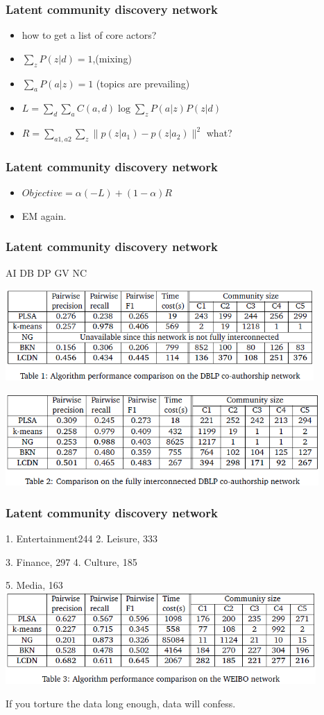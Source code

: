 \documentclass[professionalfonts]{beamer}
\begin{document}
\begin{frame}
\frametitle{Latent community discovery network}
\begin{itemize}
\item how to get a list of core actors?
\item $\sum_z P(z|d)=1$,(mixing) 
\item $\sum_a P(a|z)=1$ (topics are prevailing)
\item $L=\sum_d \sum_a C(a,d) \log \sum_z P(a|z)P(z|d)$
\item $R=\sum_{a1,a2} \sum_z \|p(z|a_1) - p(z|a_2)\|^2$ what?
\end{itemize}
\end{frame}


\begin{frame}
\frametitle{Latent community discovery network}
\begin{itemize}
\item $Objective=\alpha (-L) + (1-\alpha)R$
\item EM again.
\end{itemize}
\end{frame}

\begin{frame}
\frametitle{Latent community discovery network}
AI DB DP GV NC

\includegraphics[height=3.5cm]{lcdndblp}

\includegraphics[height=3.5cm]{lcdndblpfully}
\end{frame}

\begin{frame}
\frametitle{Latent community discovery network}
1. Entertainment244 2. Leisure,  333 

3. Finance,  297 4. Culture,  185

5. Media,  163 
\includegraphics[height=3.5cm]{lcdnweibo}

If you torture the data long enough, data will confess.
\end{frame}
\end{document}
